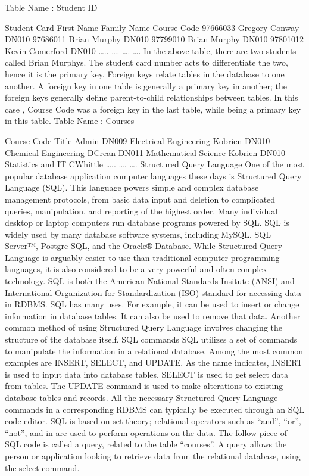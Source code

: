 \documentclass[]{article}
\begin{document}
Table Name : Student ID






Student Card
First Name
Family Name
Course Code
97666033
Gregory
Conway
DN010
97686011
Brian
Murphy
DN010
97799010
Brian
Murphy
DN010
97801012
Kevin
Comerford
DN010
…..
….
….
….
In the above table, there are two students called Brian Murphys. The student card number acts to differentiate the two, hence it is the primary key.
Foreign keys relate tables in the database to one another. A foreign key in one table is generally a primary key in another; the foreign keys generally define parent-to-child relationships between tables. In this case , Course Code was a foreign key in the last table, while being a primary key in this table.
Table Name :  Courses




Course Code
Title
Admin
DN009
Electrical Engineering
Kobrien
DN010
Chemical Engineering
DCrean
DN011
Mathematical Science
Kobrien
DN010
Statistics and IT
CWhittle
…..
….
….
Structured Query Language
One of the most popular database application computer languages these days is Structured Query Language (SQL). This language powers simple and complex database management protocols, from basic data input and deletion to complicated queries, manipulation, and reporting of the highest order.
Many individual desktop or laptop computers run database programs powered by SQL. SQL is widely used by many database software systems, including MySQL, SQL Server™, Postgre SQL, and the Oracle® Database. While Structured Query Language is arguably easier to use than traditional computer programming languages, it is also considered to be a very powerful and often complex technology.
SQL is both the American National Standards Insitute (ANSI) and International Organization for Standardization (ISO) standard for accessing data in RDBMS.
SQL has many uses. For example, it can be used to insert or change information in database tables. It can also be used to remove that data. Another common method of using Structured Query Language involves changing the structure of the database itself.
SQL commands
SQL utilizes a set of commands to manipulate the information in a relational database. Among the most common examples are INSERT, SELECT, and UPDATE. As the name indicates, INSERT is used to input data into database tables. SELECT is used to get select data from tables. The UPDATE command is used to make alterations to existing database tables and records. All the necessary Structured Query Language commands in a corresponding RDBMS can typically be executed through an SQL code editor.
SQL is based on set theory; relational operators such as “and”, “or”, “not”, and in are used to perform operations on the data.
The follow piece of SQL code is called a query, related to the table “courses”.  A query allows the person or application looking to retrieve data from the relational database, using the select command.
\end{document}
